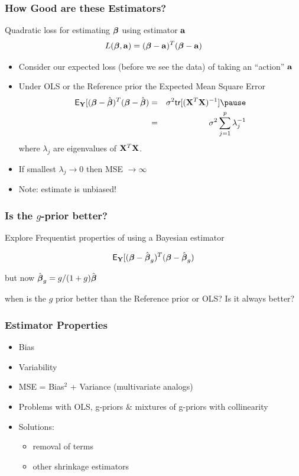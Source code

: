 \documentclass[handout]{beamer}\usepackage[]{graphicx}\usepackage[]{color}
\begin{document}
\begin{frame}
  \frametitle{How Good are these Estimators?}
Quadratic loss for estimating  $\boldsymbol{\beta}$ using estimator $\mathbf{a}$
$$ L(\boldsymbol{\beta}, \mathbf{a}) =  ( \boldsymbol{\beta} - \mathbf{a})^T(\boldsymbol{\beta} -\mathbf{a})$$ \pause

\begin{itemize}
\item Consider our expected loss (before we see the data) of taking an
``action'' $\mathbf{a}$ \pause
\item Under OLS or the  Reference prior the Expected Mean Square Error  \pause
  \begin{eqnarray*}
\E_\Y[( \b - \bhat)^T(\b -\bhat) & = &\sigma^2
  \tr[(\X^T\X)^{-1}] \pause \\
 & = & \sigma^2 \sum_{j=1}^p \lambda_j^{-1}
  \end{eqnarray*}
where $\lambda_j$ are eigenvalues of $\mathbf{X}^T\mathbf{X}$.
\pause
\item If smallest $\lambda_j \to 0$ then MSE  $\to \infty$
\item Note: estimate is unbiased!
\end{itemize}
\end{frame}

\begin{frame}
  \frametitle{Is the $g$-prior better?}

Explore Frequentist properties of using a Bayesian estimator

$$\textsf{E}_{\mathbf{Y}}[( \boldsymbol{\beta} - \hat{\boldsymbol{\beta}}_g)^T(\boldsymbol{\beta} -\hat{\boldsymbol{\beta}}_g)$$

but now $\hat{\boldsymbol{\beta}}_g = g/(1+g) \hat{\boldsymbol{\beta}}$  \pause

\vfill when is the $g$ prior better than the Reference prior or OLS?  Is it always better?
\end{frame}

\begin{frame}\frametitle{Estimator Properties}

  \begin{itemize}
  \item  Bias  \pause
  \item  Variability \pause
  \item MSE = Bias$^2$ + Variance  (multivariate analogs) \pause
\item Problems with OLS, g-priors \& mixtures of g-priors with collinearity \pause
\item Solutions: \pause
  \begin{itemize}
  \item removal of terms \pause
   \item other shrinkage estimators
  \end{itemize}

  \end{itemize}
\end{frame}
\end{document}
